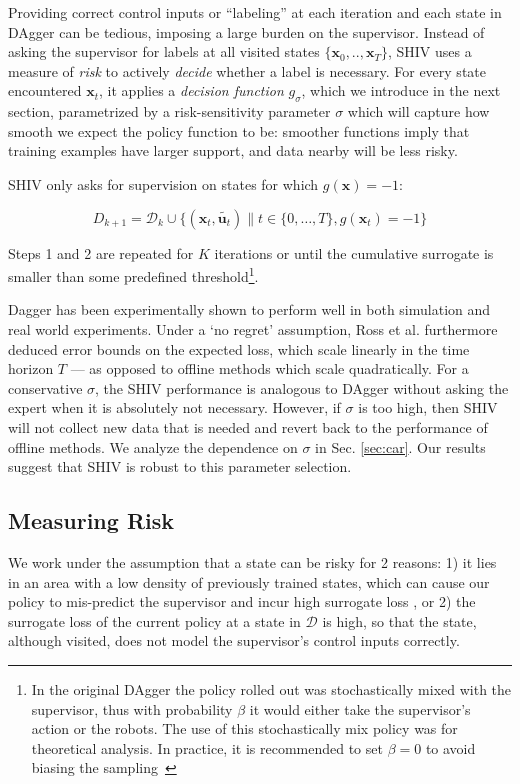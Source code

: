 \documentclass[10pt, conference]{ieeeconf}      %
\newcommand{\bu}{\mathbf{u}}
\newcommand{\bx}{\mathbf{x}}
\begin{document}
Providing correct control inputs or ``labeling'' at each
iteration and each state in DAgger can be tedious, imposing a large burden on the supervisor.
Instead of asking the supervisor for labels at all visited states $\{\bx_0,..,\bx_T\}$, SHIV uses a measure of \emph{risk} to actively \emph{decide} whether a label is necessary. For every state encountered $\bx_t$, it applies a \emph{decision function} $g_{\sigma}$, which we introduce in the next section, parametrized by a risk-sensitivity parameter $\sigma$ which will capture how smooth we expect the policy function to be: smoother functions imply that training examples have larger support, and data nearby will be less risky.

SHIV only asks for supervision on states for which $g(\bx)=-1$: 


$$D_{k+1}=\mathcal{D}_k \cup \{(\bx_t,\tilde{\bu_t})\|t\in\{0,\ldots,T\},g(\bx_t)=-1\}$$

Steps 1 and 2 are repeated for $K$ iterations or until 
the cumulative surrogate is smaller than some predefined threshold\footnote{In the original DAgger the policy rolled out
was stochastically mixed with the supervisor, thus with probability $\beta$ it would either take the supervisor's action
or the robots. The use of this stochastically mix policy was for theoretical analysis. In practice, it is recommended
to set $\beta = 0$ to avoid biasing the sampling~\cite{NIPS2014_5421,ross2010reduction}}.


Dagger has been experimentally shown to perform well in both simulation and real world
    experiments\cite{NIPS2014_5421,ross2010reduction,ross2013learning}. Under a `no regret' assumption, Ross et al.\cite{ross2010reduction} furthermore
deduced error bounds on the expected loss, which scale linearly in the time horizon $T$ --- as opposed to offline methods which scale quadratically. For a conservative $\sigma$, the SHIV performance is analogous to DAgger without asking the expert when it is absolutely not necessary. However, if $\sigma$ is too high, then SHIV will not collect new data that is needed and revert back to the performance of offline methods. We analyze the dependence on $\sigma$ in Sec. \ref{sec:car}. Our results suggest that SHIV is robust to this parameter selection. 

\subsection{Measuring Risk}
We work under the assumption that a state can be risky for 2 reasons: 1) it lies in an area with a low density of
previously trained states, which can cause our policy to mis-predict the supervisor and incur high surrogate
loss \cite{tokdar2010importance}, or 2) the surrogate loss of the current policy at a state in $\mathcal{D}$ is high, so that the state, although visited, does
not model the supervisor's control inputs correctly. 
\end{document}
